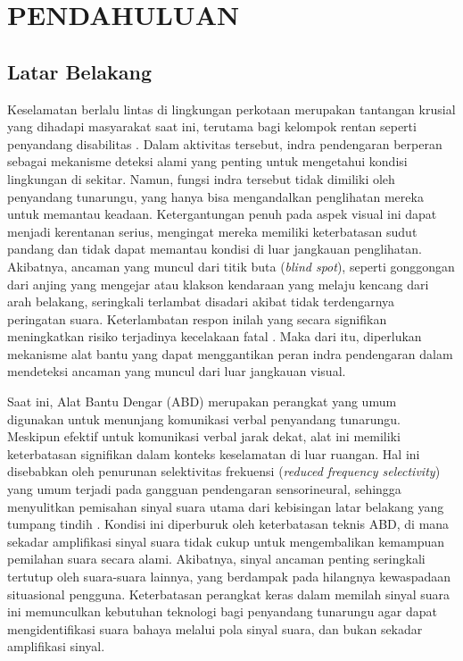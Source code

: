 \newpage
\chapter{PENDAHULUAN} \label{Bab I}

\section{Latar Belakang} \label{I.Latar Belakang}

Keselamatan berlalu lintas di lingkungan perkotaan merupakan tantangan krusial yang dihadapi masyarakat saat ini, terutama bagi kelompok rentan seperti penyandang disabilitas \cite{who2023road}. 
Dalam aktivitas tersebut, indra pendengaran berperan sebagai mekanisme deteksi alami yang penting untuk mengetahui kondisi lingkungan di sekitar. 
Namun, fungsi indra tersebut tidak dimiliki oleh penyandang tunarungu, yang hanya bisa mengandalkan penglihatan mereka untuk memantau keadaan. 
Ketergantungan penuh pada aspek visual ini dapat menjadi kerentanan serius, mengingat mereka memiliki keterbatasan sudut pandang dan tidak dapat memantau kondisi di luar jangkauan penglihatan. 
Akibatnya, ancaman yang muncul dari titik buta (\textit{blind spot}), seperti gonggongan dari anjing yang mengejar atau klakson kendaraan yang melaju kencang dari arah belakang, seringkali terlambat disadari akibat tidak terdengarnya peringatan suara.
Keterlambatan respon inilah yang secara signifikan meningkatkan risiko terjadinya kecelakaan fatal \cite{thorslund2013effects}.
Maka dari itu, diperlukan mekanisme alat bantu yang dapat menggantikan peran indra pendengaran dalam mendeteksi ancaman yang muncul dari luar jangkauan visual. \par

Saat ini, Alat Bantu Dengar (ABD) merupakan perangkat yang umum digunakan untuk menunjang komunikasi verbal penyandang tunarungu. 
Meskipun efektif untuk komunikasi verbal jarak dekat, alat ini memiliki keterbatasan signifikan dalam konteks keselamatan di luar ruangan. 
Hal ini disebabkan oleh penurunan selektivitas frekuensi (\textit{reduced frequency selectivity}) yang umum terjadi pada gangguan pendengaran sensorineural, sehingga menyulitkan pemisahan sinyal suara utama dari kebisingan latar belakang yang tumpang tindih \cite{moore1996perceptual}. 
Kondisi ini diperburuk oleh keterbatasan teknis ABD, di mana sekadar amplifikasi sinyal suara tidak cukup untuk mengembalikan kemampuan pemilahan suara secara alami. 
Akibatnya, sinyal ancaman penting seringkali tertutup oleh suara-suara lainnya, yang berdampak pada hilangnya kewaspadaan situasional pengguna. 
Keterbatasan perangkat keras dalam memilah sinyal suara ini memunculkan kebutuhan teknologi bagi penyandang tunarungu agar dapat mengidentifikasi suara bahaya melalui pola sinyal suara, dan bukan sekadar amplifikasi sinyal.\par

